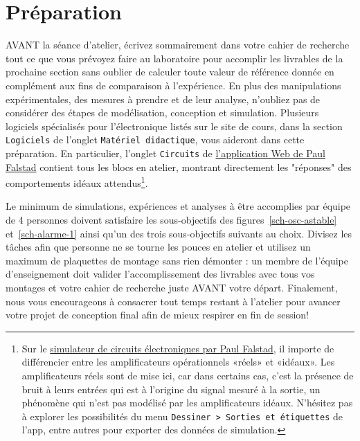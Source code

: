 \documentclass[canadien,12pt,oneside,letterpaper]{article}
\begin{document}
\section{Préparation}\label{sec:prep}
AVANT la séance d'atelier, écrivez sommairement dans votre cahier de recherche tout ce que vous prévoyez faire au laboratoire pour accomplir les livrables de la prochaine section sans oublier de calculer toute valeur de référence donnée en complément aux fins de comparaison à l'expérience. En plus des manipulations expérimentales, des mesures à prendre et de leur analyse, n'oubliez pas de considérer des étapes de modélisation, conception et simulation. Plusieurs logiciels spécialisés pour l'électronique listés sur le site de cours, dans la section \texttt{Logiciels} de l'onglet \texttt{Matériel didactique}, vous aideront dans cette préparation. En particulier, l'onglet \texttt{Circuits} de \href{https://www.falstad.com/circuit/}{l'application Web de Paul Falstad} contient tous les blocs en atelier, montrant directement les "réponses" des comportements idéaux attendus\footnote{Sur le \href{https://www.falstad.com/circuit/}{simulateur de circuits électroniques par Paul Falstad}, il importe de différencier entre les amplificateurs opérationnels «réels» et «idéaux». Les amplificateurs réels sont de mise ici, car dans certains cas, c'est la présence de bruit à leurs entrées qui est à l'origine du signal mesuré à la sortie, un phénomène qui n'est pas modélisé par les amplificateurs idéaux. N'hésitez pas à explorer les possibilités du menu \texttt{Dessiner~>~Sorties et étiquettes} de l'app, entre autres pour exporter des données de simulation.}. 

Le minimum de simulations, expériences et analyses à être accomplies par équipe de 4 personnes doivent satisfaire les sous-objectifs des figures~\ref{sch-osc-astable} et~\ref{sch-alarme-1} ainsi qu'un des trois sous-objectifs suivants au choix. Divisez les tâches afin que personne ne se tourne les pouces en atelier et utilisez un maximum de plaquettes de montage sans rien démonter : un membre de l'équipe d'enseignement doit valider l'accomplissement des livrables avec tous vos montages et votre cahier de recherche juste AVANT votre départ. Finalement, nous vous encourageons à consacrer tout temps restant à l'atelier pour avancer votre projet de conception final afin de mieux respirer en fin de session!
\end{document}
